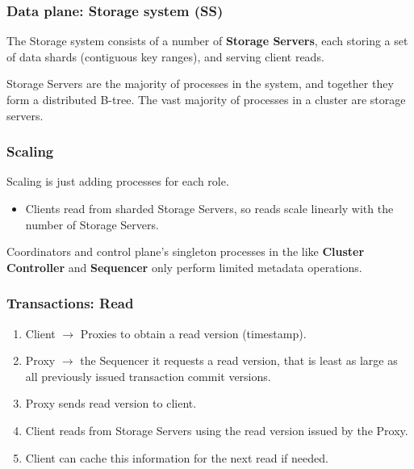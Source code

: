 

\begin{frame}
	\frametitle{Data plane: Storage system (SS)}
The Storage system consists of a number of \textbf{Storage Servers}, each
storing a set of data shards (contiguous key ranges),
and serving client reads. 
\vspace{0.5cm}

Storage Servers are the majority of processes in the system, and together they form a distributed B-tree.
The vast majority of processes in a cluster are storage servers.
	
\end{frame}

\begin{frame}
	\frametitle{Scaling}
Scaling is just adding processes for each role. \\

\begin{itemize}
    \item Clients read from sharded Storage Servers, so reads scale
linearly with the number of Storage Servers. 
\end{itemize}

\vspace{0.5cm}
Coordinators and control plane's singleton processes in the  like \textbf{Cluster Controller} and \textbf{Sequencer} only perform limited metadata operations.
	
\end{frame}


\begin{frame}
	\frametitle{Transactions: Read}
\begin{enumerate}
    \item Client $\rightarrow$ Proxies to obtain a read version (timestamp).
    \item Proxy $\rightarrow$ the Sequencer it requests a read version, that is  least as large as all previously issued transaction commit versions.
    \item Proxy sends read version to client.
    \item Client reads from Storage Servers using the read version issued by the Proxy.
    \item Client can cache this information for the next read if needed.
\end{enumerate}

\end{frame}

